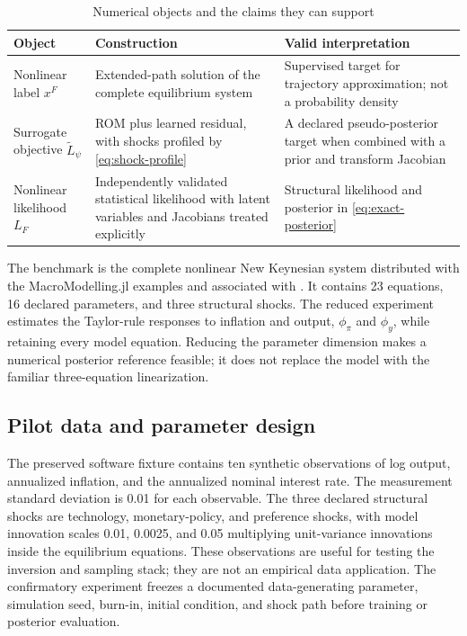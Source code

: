 \documentclass[11pt]{article}
\begin{document}
\begin{table}[t]
\centering
\caption{Numerical objects and the claims they can support}
\label{tab:objects}
\small
\begin{tabular}{p{}p{}p{}}
\toprule
Object & Construction & Valid interpretation \\
\midrule
Nonlinear label $x^F$ & Extended-path solution of the complete equilibrium system & Supervised target for trajectory approximation; not a probability density \\
Surrogate objective $\widetilde L_\psi$ & ROM plus learned residual, with shocks profiled by \eqref{eq:shock-profile} & A declared pseudo-posterior target when combined with a prior and transform Jacobian \\
Nonlinear likelihood $L_F$ & Independently validated statistical likelihood with latent variables and Jacobians treated explicitly & Structural likelihood and posterior in \eqref{eq:exact-posterior} \\
\bottomrule
\end{tabular}
\end{table}

The benchmark is the complete nonlinear New Keynesian system distributed with
the MacroModelling.jl examples \citep{kockerols2023macromodelling} and associated
with \citet{gali2015}. It contains 23 equations, 16 declared parameters, and
three structural shocks. The reduced experiment estimates the Taylor-rule
responses to inflation and output, $\phi_\pi$ and $\phi_y$, while retaining
every model equation. Reducing the parameter dimension makes a numerical
posterior reference feasible; it does not replace the model with the familiar
three-equation linearization.

\subsection{Pilot data and parameter design}

The preserved software fixture contains ten synthetic observations of log
output, annualized inflation, and the annualized nominal interest rate. The
measurement standard deviation is 0.01 for each observable. The three declared
structural shocks are technology, monetary-policy, and preference shocks, with
model innovation scales 0.01, 0.0025, and 0.05 multiplying unit-variance
innovations inside the equilibrium equations. These observations are useful
for testing the inversion and sampling stack; they are not an empirical data
application. The confirmatory experiment freezes a documented data-generating
parameter, simulation seed, burn-in, initial condition, and shock path before
training or posterior evaluation.
\end{document}
